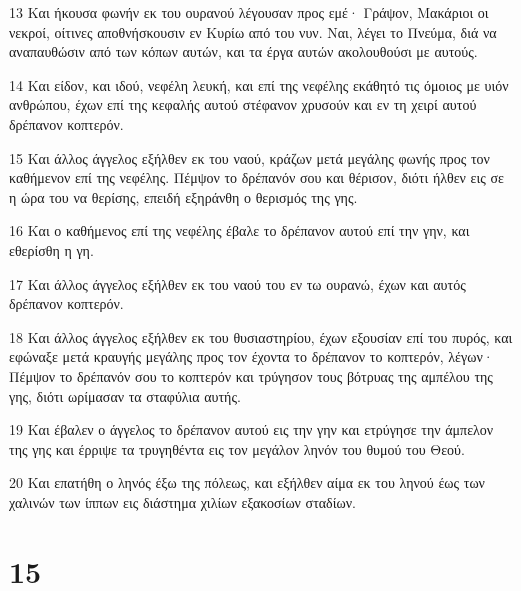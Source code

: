 \par 13 Και ήκουσα φωνήν εκ του ουρανού λέγουσαν προς εμέ· Γράψον, Μακάριοι οι νεκροί, οίτινες αποθνήσκουσιν εν Κυρίω από του νυν. Ναι, λέγει το Πνεύμα, διά να αναπαυθώσιν από των κόπων αυτών, και τα έργα αυτών ακολουθούσι με αυτούς.
\par 14 Και είδον, και ιδού, νεφέλη λευκή, και επί της νεφέλης εκάθητό τις όμοιος με υιόν ανθρώπου, έχων επί της κεφαλής αυτού στέφανον χρυσούν και εν τη χειρί αυτού δρέπανον κοπτερόν.
\par 15 Και άλλος άγγελος εξήλθεν εκ του ναού, κράζων μετά μεγάλης φωνής προς τον καθήμενον επί της νεφέλης. Πέμψον το δρέπανόν σου και θέρισον, διότι ήλθεν εις σε η ώρα του να θερίσης, επειδή εξηράνθη ο θερισμός της γης.
\par 16 Και ο καθήμενος επί της νεφέλης έβαλε το δρέπανον αυτού επί την γην, και εθερίσθη η γη.
\par 17 Και άλλος άγγελος εξήλθεν εκ του ναού του εν τω ουρανώ, έχων και αυτός δρέπανον κοπτερόν.
\par 18 Και άλλος άγγελος εξήλθεν εκ του θυσιαστηρίου, έχων εξουσίαν επί του πυρός, και εφώναξε μετά κραυγής μεγάλης προς τον έχοντα το δρέπανον το κοπτερόν, λέγων· Πέμψον το δρέπανόν σου το κοπτερόν και τρύγησον τους βότρυας της αμπέλου της γης, διότι ωρίμασαν τα σταφύλια αυτής.
\par 19 Και έβαλεν ο άγγελος το δρέπανον αυτού εις την γην και ετρύγησε την άμπελον της γης και έρριψε τα τρυγηθέντα εις τον μεγάλον ληνόν του θυμού του Θεού.
\par 20 Και επατήθη ο ληνός έξω της πόλεως, και εξήλθεν αίμα εκ του ληνού έως των χαλινών των ίππων εις διάστημα χιλίων εξακοσίων σταδίων.

\chapter{15}

